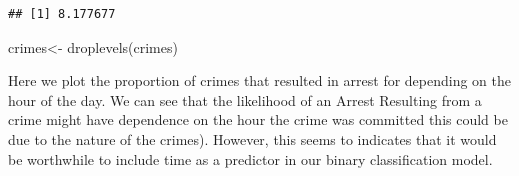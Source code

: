 \documentclass[
]{article}
\newenvironment{Shaded}{\begin{snugshade}}{\end{snugshade}}
\newcommand{\CommentTok}[1]{\textcolor[rgb]{0.56,0.35,0.01}{\textit{#1}}}
\newcommand{\ControlFlowTok}[1]{\textcolor[rgb]{0.13,0.29,0.53}{\textbf{#1}}}
\newcommand{\DecValTok}[1]{\textcolor[rgb]{0.00,0.00,0.81}{#1}}
\newcommand{\FunctionTok}[1]{\textcolor[rgb]{0.00,0.00,0.00}{#1}}
\newcommand{\NormalTok}[1]{#1}
\newcommand{\OtherTok}[1]{\textcolor[rgb]{0.56,0.35,0.01}{#1}}
\newcommand{\SpecialCharTok}[1]{\textcolor[rgb]{0.00,0.00,0.00}{#1}}
\begin{document}
\begin{verbatim}
## [1] 8.177677
\end{verbatim}

\begin{Shaded}
\begin{Highlighting}[]
\NormalTok{crimes}\OtherTok{\textless{}{-}} \FunctionTok{droplevels}\NormalTok{(crimes)}
\end{Highlighting}
\end{Shaded}

Here we plot the proportion of crimes that resulted in arrest for
depending on the hour of the day. We can see that the likelihood of an
Arrest Resulting from a crime might have dependence on the hour the
crime was committed this could be due to the nature of the crimes).
However, this seems to indicates that it would be worthwhile to include
time as a predictor in our binary classification model.

\begin{Shaded}
\end{Shaded}
\end{document}
